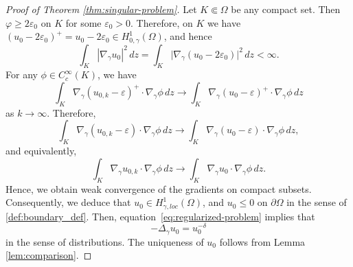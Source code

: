 \documentclass[11pt]{article}
\newcommand{\om} {\Omega}
\newcommand{\gradgr}{\nabla_{\gamma}}
\newcommand{\spacegr}{H^{1}_{0,\gamma}(\Omega)}
\begin{document}
\begin{proof}[Proof of Theorem \ref{thm:singular-problem}]
Let $K \Subset \Omega$ be any compact set. Then $\varphi \ge 2\varepsilon_0$ on $K$ for some $\varepsilon_0 > 0$. 
Therefore, on $K$ we have $(u_0 - 2\varepsilon_0)^+ = u_0 - 2\varepsilon_0 \in \spacegr$, and hence
\begin{equation*}
\int_K
|\gradgr u_0|^2 \, dz
=
\int_K
\bigl| \gradgr (u_0 - 2\varepsilon_0) \bigr|^2 \, dz
< \infty .
\end{equation*}
For any $\phi \in C_c^\infty(K)$, we have
\begin{equation*}
\int_K
\gradgr (u_{0,k}-\varepsilon)^+ \cdot \gradgr \phi \, dz
\to
\int_K
\gradgr (u_0-\varepsilon)^+ \cdot \gradgr \phi \, dz
\end{equation*}
as $k \to \infty$. Therefore,
\begin{equation*}
\int_K
\gradgr (u_{0,k}-\varepsilon) \cdot \gradgr \phi \, dz
\to
\int_K
\gradgr (u_0-\varepsilon) \cdot \gradgr \phi \, dz ,
\end{equation*}
and equivalently,
\begin{equation*}
\int_K
\gradgr u_{0,k} \cdot \gradgr \phi \, dz
\to
\int_K
\gradgr u_0 \cdot \gradgr \phi \, dz .
\end{equation*}
Hence, we obtain weak convergence of the gradients on compact subsets. Consequently, we deduce that $u_0 \in H_{\gamma,loc}^{1}(\om)$, and $u_0 \leq 0$ on $\partial \om$ in the sense of \eqref{def:boundary_def}. Then, equation~\eqref{eq:regularized-problem} implies that
\begin{equation*}
-\Delta_{\gamma} u_0 = u_0^{-\delta}
\end{equation*}
in the sense of distributions. The uniqueness of $u_0$ follows from Lemma \ref{lem:comparison}.
\end{proof}
 

\end{document}

